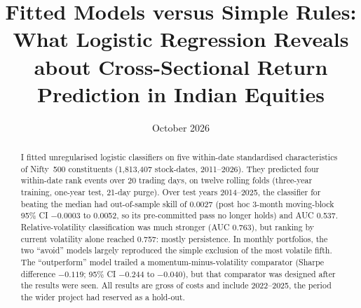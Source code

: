 \documentclass[11pt]{article}
\title{Fitted Models versus Simple Rules: What Logistic Regression Reveals about Cross-Sectional Return Prediction in Indian Equities}
\author{\authorline}
\date{October 2026}
\begin{document}
\maketitle

\begin{abstract}
\noindent
I fitted unregularised logistic classifiers on five within-date standardised characteristics of Nifty~500 constituents (1,813,407 stock-dates, 2011--2026). They predicted four within-date rank events over 20 trading days, on twelve rolling folds (three-year training, one-year test, 21-day purge). Over test years 2014--2025, the classifier for beating the median had out-of-sample skill of 0.0027 (post hoc 3-month moving-block 95\% CI $-0.0003$ to 0.0052, so its pre-committed pass no longer holds) and AUC 0.537. Relative-volatility classification was much stronger (AUC 0.763), but ranking by current volatility alone reached 0.757: mostly persistence. In monthly portfolios, the two ``avoid'' models largely reproduced the simple exclusion of the most volatile fifth. The ``outperform'' model trailed a momentum-minus-volatility comparator (Sharpe difference $-0.119$; 95\% CI $-0.244$ to $-0.040$), but that comparator was designed after the results were seen. All results are gross of costs and include 2022--2025, the period the wider project had reserved as a hold-out.
\end{abstract}
\end{document}
